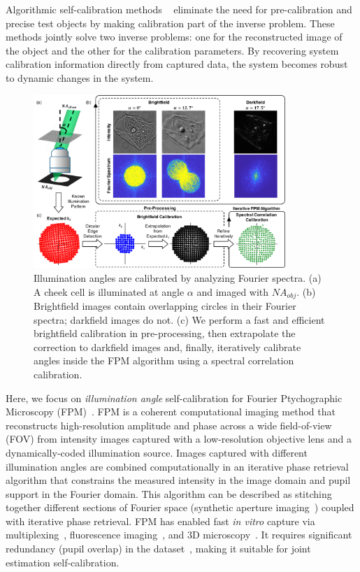 Algorithmic self-calibration methods ~\cite{Thibault2009,Ou:14,Horstmeyer:14,Yeh2015,Sun:16LEDpos,Liu:17, maiden2012annealing, zhang2013translation,Bian:13,Bian:16,Dou2017,Eckert:16,Satat2016,Pan2017,Chung:16fluor} eliminate the need for pre-calibration and precise test objects by making calibration part of the inverse problem. These methods jointly solve two inverse problems: one for the reconstructed image of the object and the other for the calibration parameters. By recovering system calibration information directly from captured data, the system becomes robust to dynamic changes in the system.

\begin{figure}[t]
	\centering
	\includegraphics[width=0.85\textwidth]{figures/fig_selfcal_fpm_overview.pdf}
	\caption{Illumination angles are calibrated by analyzing Fourier spectra. (a) A cheek cell is illuminated at angle $\alpha$ and imaged with $NA_{obj}$. (b) Brightfield images contain overlapping circles in their Fourier spectra; darkfield images do not. (c) We perform a fast and efficient brightfield calibration in pre-processing, then extrapolate the correction to darkfield images and, finally, iteratively calibrate angles inside the FPM algorithm using a spectral correlation calibration.
		}
	\label{fig:self_cal_fpm_overview}
\end{figure}

Here, we focus on \textit{illumination angle} self-calibration for Fourier Ptychographic Microscopy (FPM)~\cite{Zheng2013}. FPM is a coherent computational imaging method that reconstructs high-resolution amplitude and phase across a wide field-of-view (FOV) from intensity images captured with a low-resolution objective lens and a dynamically-coded illumination source. Images captured with different illumination angles are combined computationally in an iterative phase retrieval algorithm that constrains the measured intensity in the image domain and pupil support in the Fourier domain. This algorithm can be described as stitching together different sections of Fourier space (synthetic aperture imaging~\cite{Turpin:1995,Di:08}) coupled with iterative phase retrieval. FPM has enabled fast \textit{in vitro} capture via multiplexing~\cite{Tian2014,tian2015quantitative}, fluorescence imaging~\cite{Chung:16fluor}, and 3D microscopy~\cite{tian20153d,Horstmeyer:16}. It requires significant redundancy (pupil overlap) in the dataset~\cite{Dong:14,Sun:16}, making it suitable for joint estimation self-calibration. 

